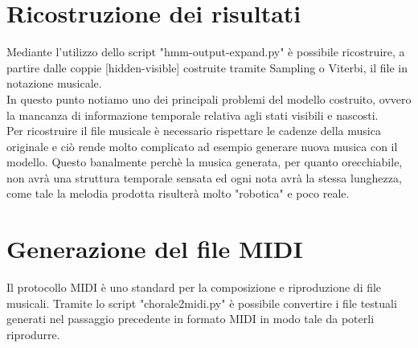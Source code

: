 \section{Ricostruzione dei risultati}
Mediante l'utilizzo dello script "hmm-output-expand.py" è possibile ricostruire, a partire dalle coppie [hidden-visible] costruite tramite Sampling o Viterbi, il file in notazione musicale.\\
In questo punto notiamo uno dei principali problemi del modello costruito, ovvero la mancanza di informazione temporale relativa agli stati visibili e nascosti. \\
Per ricostruire il file musicale è necessario rispettare le cadenze della musica originale e ciò rende molto complicato ad esempio generare nuova musica con il modello. Questo banalmente perchè la musica generata, per quanto orecchiabile, non avrà una struttura temporale sensata ed ogni nota avrà la stessa lunghezza, come tale la melodia prodotta risulterà molto "robotica" e poco reale.
\section{Generazione del file MIDI}
Il protocollo MIDI è uno standard per la composizione e riproduzione di file musicali. Tramite lo script "chorale2midi.py" è possibile convertire i file testuali generati nel passaggio precedente in formato MIDI in modo tale da poterli riprodurre. \\
